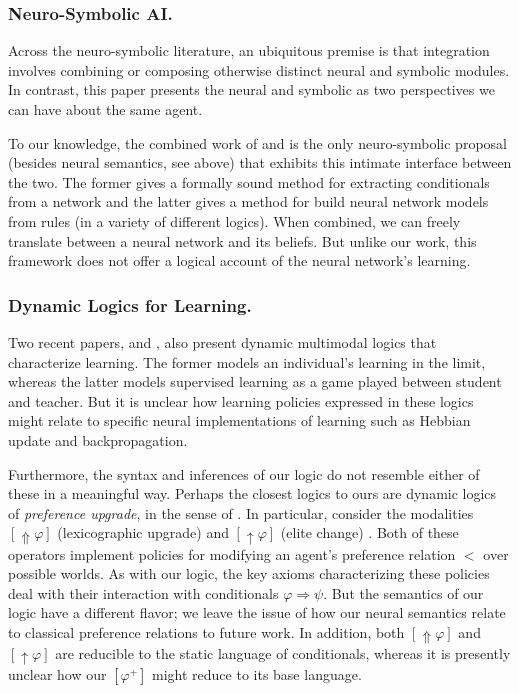 \documentclass[letterpaper]{article}
\theoremstyle{definition}
\begin{document}
\subsubsection{Neuro-Symbolic AI.}
Across the neuro-symbolic literature, an ubiquitous premise is that integration involves combining or composing otherwise distinct neural and symbolic modules.  In contrast, this paper presents the neural and symbolic as two perspectives we can have about the same agent.

To our knowledge, the combined work of \cite{garcez2001symbolic} and \cite{garcez2008neural} is the only neuro-symbolic proposal (besides neural semantics, see above) that exhibits this intimate interface between the two.  The former gives a formally sound method for extracting conditionals from a network and the latter gives a method for build neural network models from rules (in a variety of different logics).  When combined, we can freely translate between a neural network and its beliefs.  But unlike our work, this framework does not offer a logical account of the neural network's learning.


\subsubsection{Dynamic Logics for Learning.}
Two recent papers, \cite{baltag2019dynamic} and \cite{baltag2019right}, also present dynamic multimodal logics that characterize learning.  The former models an individual's learning in the limit, whereas the latter models supervised learning as a game played between student and teacher.  But it is unclear how learning policies expressed in these logics might relate to specific neural implementations of learning such as Hebbian update and backpropagation.

Furthermore, the syntax and inferences of our logic do not resemble either of these in a meaningful way. Perhaps the closest logics to ours are dynamic logics of \emph{preference upgrade}, in the sense of \cite{van2007prefupgrade}.  In particular, consider the modalities $[{\Uparrow} \varphi]$ (lexicographic upgrade) and $[{\uparrow} \varphi]$ (elite change) \cite{van2007beliefrevision}.  Both of these operators implement policies for modifying an agent's preference relation $<$ over possible worlds.  As with our logic, the key axioms characterizing these policies deal with their interaction with conditionals $\varphi \Rightarrow \psi$.  But the semantics of our logic have a different flavor; we leave the issue of how our neural semantics relate to classical preference relations to future work.  In addition, both $[{\Uparrow} \varphi]$ and $[{\uparrow} \varphi]$ are reducible to the static language of conditionals, whereas it is presently unclear how our $[\varphi^+]$ might reduce to its base language.
\end{document}
